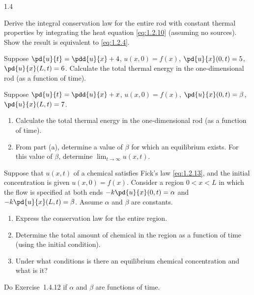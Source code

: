 \begin{exercises}{1.4}
\item Derive the integral conservation law for the entire rod with constant thermal properties by integrating the heat equation \eqref{eq:1.2.10} (assuming no sources). Show the result is equivalent to \eqref{eq:1.2.4}.

\item Suppose $\pd{u}{t} = \pdd{u}{x} + 4$, $u(x,0) = f(x)$, $\pd{u}{x}(0,t) = 5$, $\pd{u}{x}(L,t) = 6$. Calculate the total thermal energy in the one-dimensional rod (as a function of time).

\item Suppose $\pd{u}{t} = \pdd{u}{x} + x$, $u(x,0) = f(x)$, $\pd{u}{x}(0,t) = \beta$, $\pd{u}{x}(L,t) = 7$.
\begin{enumerate}
\item[(a)] Calculate the total thermal energy in the one-dimensional rod (as a function of time).
\item[(b)] From part (a), determine a value of $\beta$ for which an equilibrium exists. For this value of $\beta$, determine $\lim_{t\to\infty} u(x,t)$.
\end{enumerate}

\item Suppose that $u(x,t)$ of a chemical satisfies Fick's law \eqref{eq:1.2.13}, and the initial concentration is given $u(x,0) = f(x)$. Consider a region $0 < x < L$ in which the flow is specified at both ends $-k\pd{u}{x}(0,t) = \alpha$ and $-k\pd{u}{x}(L,t) = \beta$. Assume $\alpha$ and $\beta$ are constants.
\begin{enumerate}
\item[(a)] Express the conservation law for the entire region.
\item[(b)] Determine the total amount of chemical in the region as a function of time (using the initial condition).
\item[(c)] Under what conditions is there an equilibrium chemical concentration and what is it?
\end{enumerate}

\item Do Exercise~1.4.12 if $\alpha$ and $\beta$ are functions of time.

\end{exercises}

